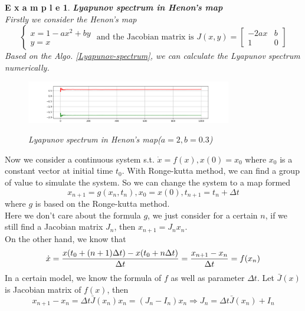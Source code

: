 \documentclass[12pt]{article}
\theoremstyle{plain}
\newtheorem{example}{\textbf{E x a m p l e}}[section]
\begin{document}
\begin{example}\textbf{Lyapunov spectrum in Henon's map}
\\\noindent Firstly we consider the Henon's map
$$
\left\{\begin{array}{l}
x = 1 - ax^2 + by \\
y = x
\end{array}\right. \text{ and the Jacobian matrix is } J(x, y) = \left[\begin{array}{lll}
-2ax    & b \\
1       & 0
\end{array}\right]
$$
Based on the Algo. \ref{Lyapunov-spectrum}, we can calculate the Lyapunov spectrum numerically.
\begin{figure}[H]
\begin{center}
\includegraphics[width=0.8\textwidth]{figure/section3/Lya-spec-Henon.png} \\
\caption{Lyapunov spectrum in Henon's map($a = 2, b = 0.3$)}
\end{center}
\end{figure}
\end{example}


Now we consider a continuous system s.t. $\dot x = f(x), x(0) = x_0$ where $x_0$ is a constant vector at initial time $t_0$. With Ronge-kutta method, we can find a group of value to simulate the system. So we can change the system to a map formed 
$$
x_{n+1} = g(x_n, t_n), x_0 = x(0), t_{n+1} = t_n + \Delta t
$$
where $g$ is based on the Ronge-kutta method. 
\\\noindent Here we don't care about the formula $g$, we just consider for a certain $n$, if we still find a Jacobian matrix $J_n$, then $x_{n+1} = J_n x_n$.
\\\noindent On the other hand, we know that 
$$
\dot x = {x(t_0+(n+1)\Delta t) - x(t_0+n\Delta t) \over \Delta t} = {x_{n+1} - x_n \over \Delta t} = f(x_n)
$$
            In a certain model, we know the formula of $f$ as well as parameter $\Delta t$. Let $\bar J(x)$ is Jacobian matrix of $f(x)$, then
$$
x_{n+1} - x_n = \Delta t \bar J(x_n)x_n = (J_n - I_n) x_n \Rightarrow J_n = \Delta t\bar J(x_n) + I_n
$$
\end{document}
